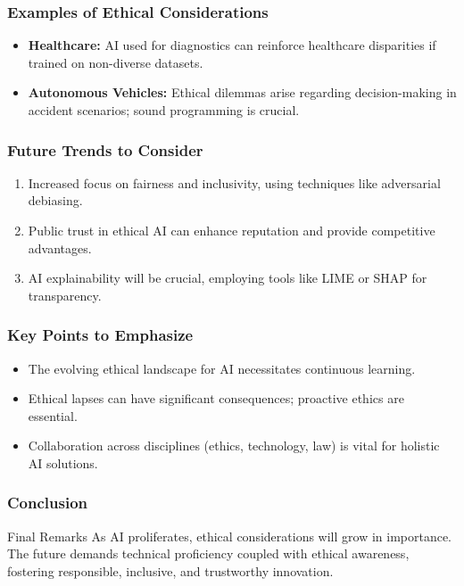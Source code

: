 \documentclass[aspectratio=169]{beamer}
\begin{document}
\begin{frame}[fragile]
  \frametitle{Examples of Ethical Considerations}
  \begin{itemize}
    \item \textbf{Healthcare:} AI used for diagnostics can reinforce healthcare disparities if trained on non-diverse datasets.
    \item \textbf{Autonomous Vehicles:} Ethical dilemmas arise regarding decision-making in accident scenarios; sound programming is crucial.
  \end{itemize}
\end{frame}

\begin{frame}[fragile]
  \frametitle{Future Trends to Consider}
  \begin{enumerate}
    \item Increased focus on fairness and inclusivity, using techniques like adversarial debiasing.
    \item Public trust in ethical AI can enhance reputation and provide competitive advantages.
    \item AI explainability will be crucial, employing tools like LIME or SHAP for transparency.
  \end{enumerate}
\end{frame}

\begin{frame}[fragile]
  \frametitle{Key Points to Emphasize}
  \begin{itemize}
    \item The evolving ethical landscape for AI necessitates continuous learning.
    \item Ethical lapses can have significant consequences; proactive ethics are essential.
    \item Collaboration across disciplines (ethics, technology, law) is vital for holistic AI solutions.
  \end{itemize}
\end{frame}

\begin{frame}[fragile]
  \frametitle{Conclusion}
  \begin{block}{Final Remarks}
    As AI proliferates, ethical considerations will grow in importance. The future demands technical proficiency coupled with ethical awareness, fostering responsible, inclusive, and trustworthy innovation.
  \end{block}
\end{frame}
\end{document}
